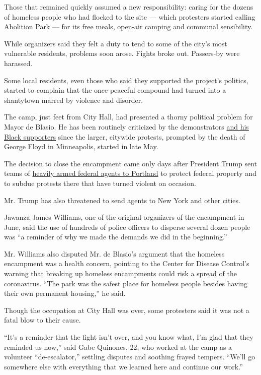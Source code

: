 Those that remained quickly assumed a new responsibility: caring for the
dozens of homeless people who had flocked to the site --- which
protesters started calling Abolition Park --- for its free meals,
open-air camping and communal sensibility.

While organizers said they felt a duty to tend to some of the city's
most vulnerable residents, problems soon arose. Fights broke out.
Passers-by were harassed.

Some local residents, even those who said they supported the project's
politics, started to complain that the once-peaceful compound had turned
into a shantytown marred by violence and disorder.

The camp, just feet from City Hall, had presented a thorny political
problem for Mayor de Blasio. He has been routinely criticized by the
demonstrators
\href{https://www.nytimes3xbfgragh.onion/2020/06/12/nyregion/de-blasio-blacks-protest.html}{and
his Black supporters} since the larger, citywide protests, prompted by
the death of George Floyd in Minneapolis, started in late May.

The decision to close the encampment came only days after President
Trump sent teams of
\href{https://www.nytimes3xbfgragh.onion/2020/07/21/us/portland-protests.html}{heavily
armed federal agents to Portland} to protect federal property and to
subdue protests there that have turned violent on occasion.

Mr. Trump has also threatened to send agents to New York and other
cities.

Jawanza James Williams, one of the original organizers of the encampment
in June, said the use of hundreds of police officers to disperse several
dozen people was ``a reminder of why we made the demands we did in the
beginning.''

Mr. Williams also disputed Mr. de Blasio's argument that the homeless
encampment was a health concern, pointing to the Center for Disease
Control's warning that breaking up homeless encampments could risk a
spread of the coronavirus. ``The park was the safest place for homeless
people besides having their own permanent housing,'' he said.

Though the occupation at City Hall was over, some protesters said it was
not a fatal blow to their cause.

``It's a reminder that the fight isn't over, and you know what, I'm glad
that they reminded us now,'' said Gabe Quinones, 22, who worked at the
camp as a volunteer ``de-escalator,'' settling disputes and soothing
frayed tempers. ``We'll go somewhere else with everything that we
learned here and continue our work.''

